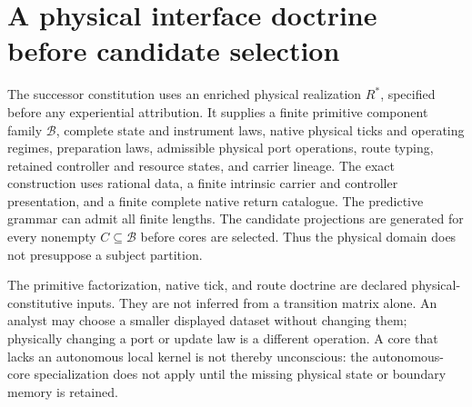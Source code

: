 \section{A physical interface doctrine before candidate selection}
\label{sec:spc2-realization}
The successor constitution uses an enriched physical realization
$R^\ast$, specified before any experiential attribution. It supplies
a finite primitive component family $\mathcal B$, complete state and
instrument laws, native physical ticks and operating regimes, preparation
laws, admissible physical port operations, route typing, retained controller
and resource states, and carrier lineage. The exact construction uses rational
data, a finite intrinsic carrier and controller presentation, and a finite complete native return catalogue. The predictive grammar can admit all finite lengths. The candidate projections
are generated for every nonempty $C\subseteq\mathcal B$ before cores are
selected. Thus the physical domain does not presuppose a subject partition.

The primitive factorization, native tick, and route doctrine are declared
physical-constitutive inputs. They are not inferred from a transition
matrix alone. An analyst may choose a smaller displayed dataset without
changing them; physically changing a port or update law is a different
operation. A core that lacks an autonomous local kernel is not thereby
unconscious: the autonomous-core specialization does not apply until the
missing physical state or boundary memory is retained.

